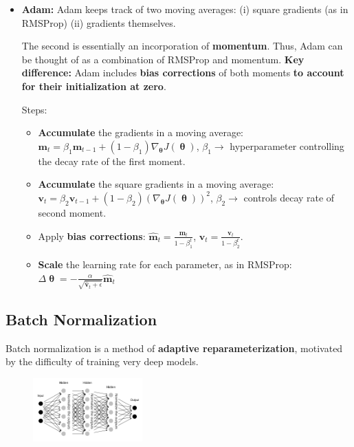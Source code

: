 \begin{itemize}
  \item \textbf{Adam:} Adam keeps track of two moving averages: (i) square gradients (as in RMSProp) (ii) gradients themselves.

    The second is essentially an incorporation of \textbf{momentum}. Thus, Adam can be thought of as a combination of RMSProp and momentum. \textbf{Key difference:} Adam includes \textbf{bias corrections} of both moments \textbf{to account for their initialization at zero}.

    Steps:

    \begin{itemize}
      \item \textbf{Accumulate} the gradients in a moving average: $\mathbf{m}_t = \beta_1 \mathbf{m}_{t-1} + (1 - \beta_1) \nabla_{\boldsymbol{\uptheta}} J(\boldsymbol{\uptheta})$, $\beta_1 \rightarrow$ hyperparameter controlling the decay rate of the first moment.
      \item \textbf{Accumulate} the square gradients in a moving average: $\mathbf{v}_t = \beta_2 \mathbf{v}_{t-1} + (1 - \beta_2) (\nabla_{\boldsymbol{\uptheta}} J(\boldsymbol{\uptheta}))^2$, $\beta_2 \rightarrow$ controls decay rate of second moment.
      \item Apply \textbf{bias corrections}: $\hat{\mathbf{m}}_t = \frac{\mathbf{m}_t}{1 - \beta_1^t}$, $\hat{\mathbf{v}}_t = \frac{\mathbf{v}_t}{1 - \beta_2^t}$.
      \item \textbf{Scale} the learning rate for each parameter, as in RMSProp: $\Delta \boldsymbol{\uptheta} = -\frac{\alpha}{\sqrt{\hat{\mathbf{v}}_t + \epsilon}} \hat{\mathbf{m}}_t$
    \end{itemize}

\end{itemize}

\subsection*{Batch Normalization}

Batch normalization is a method of \textbf{adaptive reparameterization}, motivated by the difficulty of training very deep models.

\begin{figure}[H]
  \centering
  \includegraphics[width=0.375\textwidth]{images/batch_normalization.png}
\end{figure}

